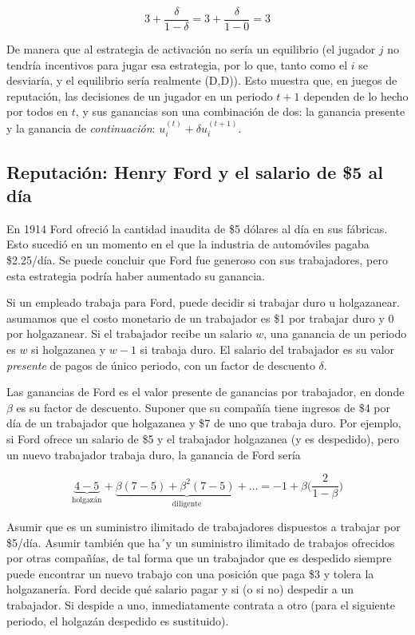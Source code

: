 \documentclass[12pt]{scrartcl}
\begin{document}
\[ 3 + \frac{\delta}{1-\delta} = 3 + \frac{\delta}{1-0} = 3 \]

De manera que al estrategia de activación no sería un equilibrio (el jugador $j$ no tendría incentivos para jugar esa estrategia, por lo que, tanto como el $i$ se desviaría, y el equilibrio sería realmente (D,D)). Esto muestra que, en juegos de reputación, las decisiones de un jugador en un periodo $t+1$ dependen de lo hecho por todos en $t$, y sus ganancias son una combinación de dos: la ganancia presente y la ganancia de \textit{continuación}: $u_i^{(t)} + \delta u_i^{(t+1)}$.

\subsection{Reputación: Henry Ford y el salario de \$5 al día}

En 1914 Ford ofreció la cantidad inaudita de \$5 dólares al día en sus fábricas. Esto sucedió en un momento en el que la industria de automóviles pagaba \$2.25/día. Se puede concluir que Ford fue generoso con sus trabajadores, pero esta estrategia podría haber aumentado su ganancia.

Si un empleado trabaja para Ford, puede decidir si trabajar duro u holgazanear. asumamos que el costo monetario de un trabajador es \$1 por trabajar duro y 0 por holgazanear. Si el trabajador recibe un salario $w$, una ganancia de un periodo es $w$ si holgazanea y $w-1$ si trabaja duro. El salario del trabajador es su valor \textit{presente} de pagos de único periodo, con un factor de descuento $\delta$. 

Las ganancias de Ford es el valor presente de ganancias por trabajador, en donde $\beta$ es su factor de descuento. Suponer que su compañía tiene ingresos de \$4 por día de un trabajador que holgazanea y \$7 de uno que trabaja duro. Por ejemplo, si Ford ofrece un salario de \$5 y el trabajador holgazanea (y es despedido), pero un nuevo trabajador trabaja duro, la ganancia de Ford sería

\[ 
	\underbrace{4-5}_{\text{holgazán}}+\underbrace{\beta(7-5)+\beta^2(7-5)+\dots}_{\text{diligente}}=-1 + \beta\Bigg (\frac{2}{1-\beta} \Bigg )
\]

Asumir que es un suministro ilimitado de trabajadores dispuestos a trabajar por \$5/día. Asumir también que ha´y un suministro ilimitado de trabajos ofrecidos por otras compañías, de tal forma que un trabajador que es despedido siempre puede encontrar un nuevo trabajo con una posición que paga \$3 y tolera la holgazanería. Ford decide qué salario pagar y si (o si no) despedir a un trabajador. Si despide a uno, inmediatamente contrata a otro (para el siguiente periodo, el holgazán despedido es sustituido). 
\end{document}
